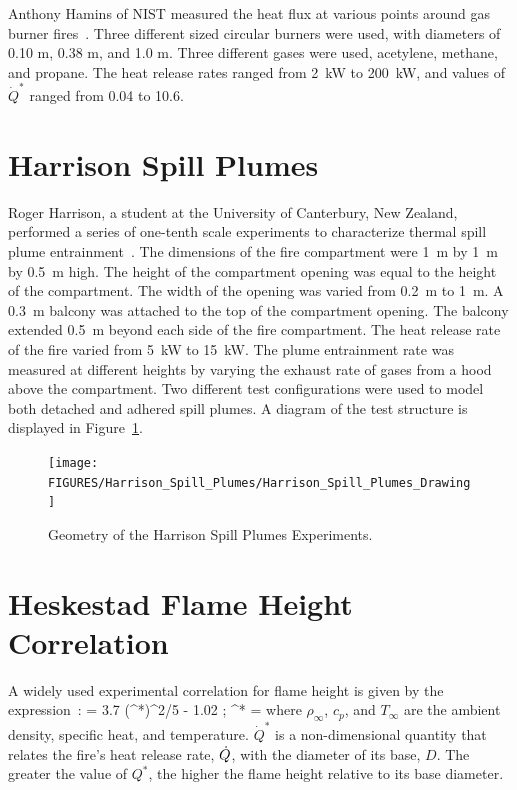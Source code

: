 Anthony Hamins of NIST measured the heat flux at various points around gas burner fires~\cite{Hostikka:3}. Three different sized circular burners were used, with diameters of 0.10 m, 0.38 m, and 1.0 m. Three different gases were used, acetylene, methane, and propane. The heat release rates ranged from 2~kW to 200~kW, and values of $\dot{Q}^*$ ranged from 0.04 to 10.6.


\section{Harrison Spill Plumes}
\label{Harrison_Spill_Plumes_Description}

Roger Harrison, a student at the University of Canterbury, New Zealand, performed a series of one-tenth scale experiments to characterize thermal spill plume entrainment~\cite{Harrison:2009,Harrison:IAFSS2008,Harrison:FT2007,Harrison:FSJ2010}. The dimensions of the fire compartment were 1~m by 1~m by 0.5~m high.  The height of the compartment opening was equal to the height of the compartment. The width of the opening was varied from 0.2~m to 1~m.  A 0.3~m balcony was attached to the top of the compartment opening. The balcony extended 0.5~m beyond each side of the fire compartment.  The heat release rate of the fire varied from 5~kW to 15~kW.
The plume entrainment rate was measured at different heights by varying the exhaust rate of gases from a hood above the compartment.
Two different test configurations were used to model both detached and adhered spill plumes. A diagram of the test structure is displayed in Figure~\ref{Harrison_Drawing}.

\begin{figure}[p]
\texttt{[image: FIGURES/Harrison\_Spill\_Plumes/Harrison\_Spill\_Plumes\_Drawing]}
\caption{Geometry of the Harrison Spill Plumes Experiments.}
\label{Harrison_Drawing}
\end{figure}




\section{Heskestad Flame Height Correlation}
\label{Heskestad_Flame_Height_Description}

A widely used experimental correlation for flame height is given by the expression~\cite{Heskestad:FSJ1983,SFPE:Heskestad}:
\be
    = 3.7 \; (^*)^{2/5} - 1.02  \quad ; \quad {}^* = 
\ee
where $\rho_\infty$, $c_p$, and $T_\infty$ are the ambient density, specific heat, and temperature. $\dot{Q}^*$ is a non-dimensional quantity that relates the fire's heat release rate, $\dot{Q}$, with the diameter of its base, $D$. The greater the value of $Q^*$, the higher the flame height relative to its base diameter.

